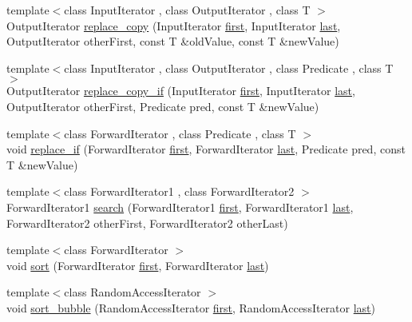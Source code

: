 \begin{DoxyCompactItemize}
\item 
{\footnotesize template$<$class Input\+Iterator , class Output\+Iterator , class T $>$ }\\Output\+Iterator \hyperlink{namespaceprism_a16d85ecb70d2f216714a0146a057a105}{replace\+\_\+copy} (Input\+Iterator \hyperlink{namespaceprism_ae3fb7a1926a9e8e59300cd5e370470da}{first}, Input\+Iterator \hyperlink{namespaceprism_abe4956c4e865f55ca126b7fb973b5078}{last}, Output\+Iterator other\+First, const T \&old\+Value, const T \&new\+Value)
\item 
{\footnotesize template$<$class Input\+Iterator , class Output\+Iterator , class Predicate , class T $>$ }\\Output\+Iterator \hyperlink{namespaceprism_a55d702599739f7137516dcd095119f15}{replace\+\_\+copy\+\_\+if} (Input\+Iterator \hyperlink{namespaceprism_ae3fb7a1926a9e8e59300cd5e370470da}{first}, Input\+Iterator \hyperlink{namespaceprism_abe4956c4e865f55ca126b7fb973b5078}{last}, Output\+Iterator other\+First, Predicate pred, const T \&new\+Value)
\item 
{\footnotesize template$<$class Forward\+Iterator , class Predicate , class T $>$ }\\void \hyperlink{namespaceprism_af118c19f6b5448319eb3aaf2d556ac54}{replace\+\_\+if} (Forward\+Iterator \hyperlink{namespaceprism_ae3fb7a1926a9e8e59300cd5e370470da}{first}, Forward\+Iterator \hyperlink{namespaceprism_abe4956c4e865f55ca126b7fb973b5078}{last}, Predicate pred, const T \&new\+Value)
\item 
{\footnotesize template$<$class Forward\+Iterator1 , class Forward\+Iterator2 $>$ }\\Forward\+Iterator1 \hyperlink{namespaceprism_a03dbb806369b062fd90909fd826c2ee4}{search} (Forward\+Iterator1 \hyperlink{namespaceprism_ae3fb7a1926a9e8e59300cd5e370470da}{first}, Forward\+Iterator1 \hyperlink{namespaceprism_abe4956c4e865f55ca126b7fb973b5078}{last}, Forward\+Iterator2 other\+First, Forward\+Iterator2 other\+Last)
\item 
{\footnotesize template$<$class Forward\+Iterator $>$ }\\void \hyperlink{namespaceprism_a9bf397cad0a67b67fbd1ecddf40d405e}{sort} (Forward\+Iterator \hyperlink{namespaceprism_ae3fb7a1926a9e8e59300cd5e370470da}{first}, Forward\+Iterator \hyperlink{namespaceprism_abe4956c4e865f55ca126b7fb973b5078}{last})
\item 
{\footnotesize template$<$class Random\+Access\+Iterator $>$ }\\void \hyperlink{namespaceprism_aa597d262eb2f9ef80703c883a2d18d1e}{sort\+\_\+bubble} (Random\+Access\+Iterator \hyperlink{namespaceprism_ae3fb7a1926a9e8e59300cd5e370470da}{first}, Random\+Access\+Iterator \hyperlink{namespaceprism_abe4956c4e865f55ca126b7fb973b5078}{last})

\end{DoxyCompactItemize}
